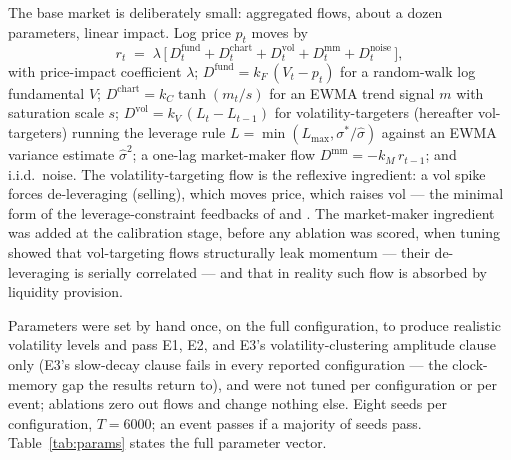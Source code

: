 \documentclass[11pt]{article}
\begin{document}
The base market is deliberately small: aggregated flows, about a dozen
parameters, linear impact. Log price $p_t$ moves by
%
\begin{equation}
r_t \;=\; \lambda\,\bigl[\,D^{\mathrm{fund}}_t + D^{\mathrm{chart}}_t +
D^{\mathrm{vol}}_t + D^{\mathrm{mm}}_t + D^{\mathrm{noise}}_t\,\bigr],
\label{eq:market}
\end{equation}
%
with price-impact coefficient $\lambda$;
$D^{\mathrm{fund}} = k_F\,(V_t - p_t)$ for a random-walk log fundamental $V$;
$D^{\mathrm{chart}} = k_C \tanh(m_t/s)$ for an EWMA trend signal $m$ with
saturation scale $s$;
$D^{\mathrm{vol}} = k_V\,(L_t - L_{t-1})$ for volatility-targeters (hereafter
vol-targeters) running the
leverage rule $L = \min(L_{\max}, \sigma^{*}/\hat\sigma)$ against an EWMA
variance estimate $\hat\sigma^2$;
a one-lag market-maker flow $D^{\mathrm{mm}} = -k_M\, r_{t-1}$; and i.i.d.\
noise. The volatility-targeting flow is the reflexive ingredient: a vol spike
forces de-leveraging (selling), which moves price, which raises vol --- the
minimal form of the leverage-constraint feedbacks of \citet{brunnermeier2009}
and \citet{adrian2010}. The
market-maker ingredient was added at the calibration stage, before any
ablation was scored, when tuning showed that vol-targeting flows structurally
leak momentum --- their de-leveraging is serially correlated --- and that in
reality such flow is absorbed by liquidity provision.

Parameters were set by hand once, on the full configuration, to produce
realistic volatility levels and pass E1, E2, and E3's
volatility-clustering amplitude clause only (E3's slow-decay clause
fails in every reported configuration --- the clock-memory gap the
results return to), and were not tuned per
configuration
or per event; ablations zero out flows and change nothing else. Eight seeds
per configuration, $T = 6000$; an event passes if a majority of seeds pass.
Table~\ref{tab:params} states the full parameter vector.
\end{document}
